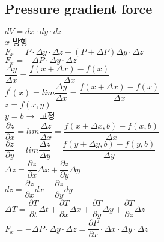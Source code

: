 \documentclass[a4paper]{article}
\begin{document}
\subsection{Pressure gradient force}

$ dV = dx \cdot dy \cdot dz $\\

$x$ 방향 \\

$ F_{x} = P \cdot \Delta y \cdot \Delta z - \left( P + \Delta P \right) \Delta y \cdot \Delta z$\\

$ F_{x} = - \Delta P \cdot \Delta y \cdot \Delta z $\\

$ \dfrac { \Delta y}{\Delta x } = \dfrac {f\left(x + \Delta x \right) - f\left(x \right)}{ \Delta x}$\\

$f^{\prime} \left(x \right) = lim \dfrac { \Delta y}{\Delta x } 
= \dfrac {f\left(x + \Delta x \right) - f\left(x \right)}{ \Delta x}$\\

$z = f \left( x, y \right) $ \\
$y = b \rightarrow $ 고정 \\

$\dfrac{\partial z}{\partial x} = lim \dfrac { \Delta z}{\Delta x } 
= \dfrac {f\left(x + \Delta x, b \right) - f\left(x, b \right)}{ \Delta x}$\\

$\dfrac{\partial z}{\partial y} = lim \dfrac { \Delta z}{\Delta y } 
= \dfrac {f\left(y + \Delta y, b \right) - f\left(y, b \right)}{ \Delta y}$\\

$ \Delta z = \dfrac{\partial z}{\partial x} \Delta x + \dfrac{\partial z}{\partial y} \Delta y $\\

$ dz = \dfrac{\partial z}{\partial x} dx + \dfrac{\partial z}{\partial y} dy $\\


$ \Delta T = \dfrac{\partial T}{\partial t} \Delta t 
+ \dfrac{\partial T}{\partial x} \Delta x 
+ \dfrac{\partial T}{\partial y} \Delta y 
+ \dfrac{\partial T}{\partial z} \Delta z $\\

$ F_{x} = - \Delta P \cdot \Delta y \cdot \Delta z 
= \dfrac{\partial P}{\partial x} \cdot \Delta x \cdot \Delta y \cdot \Delta z $\\
\end{document}
